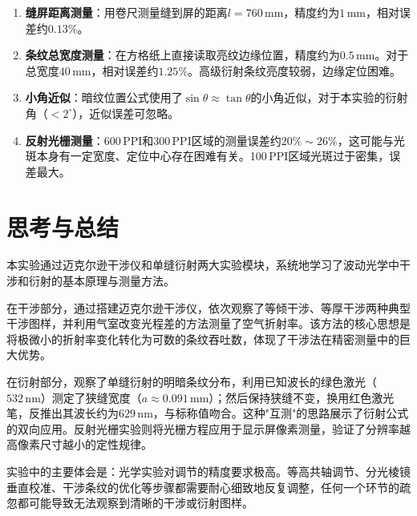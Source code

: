 \documentclass[UTF8]{article}
\begin{document}
\begin{enumerate}
    \item \textbf{缝屏距离测量}：用卷尺测量缝到屏的距离$l = 760\,\mathrm{mm}$，精度约为$1\,\mathrm{mm}$，相对误差约$0.13\%$。
    \item \textbf{条纹总宽度测量}：在方格纸上直接读取亮纹边缘位置，精度约为$0.5\,\mathrm{mm}$。对于总宽度$40\,\mathrm{mm}$，相对误差约$1.25\%$。高级衍射条纹亮度较弱，边缘定位困难。
    \item \textbf{小角近似}：暗纹位置公式使用了$\sin\theta \approx \tan\theta$的小角近似，对于本实验的衍射角（$< 2^{\circ}$），近似误差可忽略。
    \item \textbf{反射光栅测量}：600\,PPI和300\,PPI区域的测量误差约$20\%\sim26\%$，这可能与光斑本身有一定宽度、定位中心存在困难有关。100\,PPI区域光斑过于密集，误差最大。
\end{enumerate}

\section{思考与总结}

本实验通过迈克尔逊干涉仪和单缝衍射两大实验模块，系统地学习了波动光学中干涉和衍射的基本原理与测量方法。

在干涉部分，通过搭建迈克尔逊干涉仪，依次观察了等倾干涉、等厚干涉两种典型干涉图样，并利用气室改变光程差的方法测量了空气折射率。该方法的核心思想是将极微小的折射率变化转化为可数的条纹吞吐数，体现了干涉法在精密测量中的巨大优势。

在衍射部分，观察了单缝衍射的明暗条纹分布，利用已知波长的绿色激光（$532\,\mathrm{nm}$）测定了狭缝宽度（$a \approx 0.091\,\mathrm{mm}$）；然后保持狭缝不变，换用红色激光笔，反推出其波长约为$629\,\mathrm{nm}$，与标称值吻合。这种"互测"的思路展示了衍射公式的双向应用。反射光栅实验则将光栅方程应用于显示屏像素测量，验证了分辨率越高像素尺寸越小的定性规律。

实验中的主要体会是：光学实验对调节的精度要求极高。等高共轴调节、分光棱镜垂直校准、干涉条纹的优化等步骤都需要耐心细致地反复调整，任何一个环节的疏忽都可能导致无法观察到清晰的干涉或衍射图样。
\end{document}
